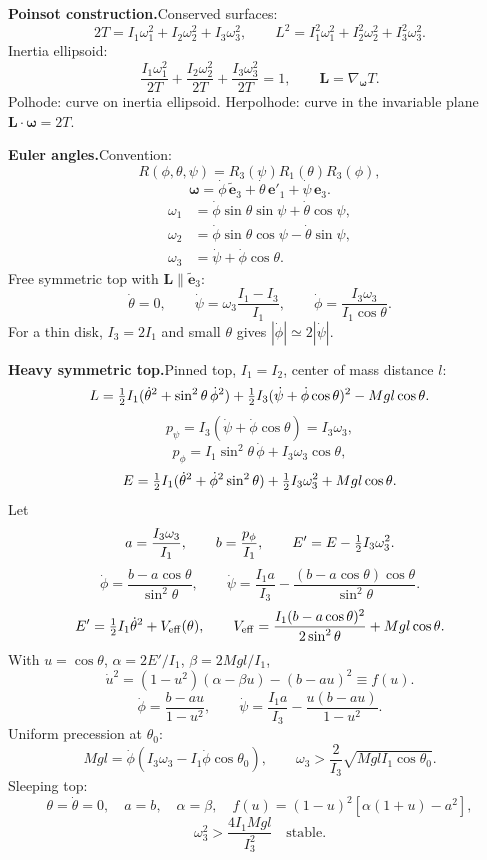 \noindent\textbf{Poinsot construction.}\quad Conserved surfaces:
\[
2T=I_1\omega_1^2+I_2\omega_2^2+I_3\omega_3^2,
\qquad
L^2=I_1^2\omega_1^2+I_2^2\omega_2^2+I_3^2\omega_3^2.
\]
Inertia ellipsoid:
\[
\frac{I_1\omega_1^2}{2T}
+\frac{I_2\omega_2^2}{2T}
+\frac{I_3\omega_3^2}{2T}=1,\qquad
\mathbf L=\nabla_{\bm\omega}T.
\]
Polhode: curve on inertia ellipsoid. Herpolhode: curve in the invariable plane
$\mathbf L\cdot\bm\omega=2T$.

\noindent\textbf{Euler angles.}\quad Convention:
\[
R(\phi,\theta,\psi)=R_3(\psi)R_1(\theta)R_3(\phi),
\]
\[
\bm\omega=\dot\phi\,\tilde{\mathbf e}_3+\dot\theta\,\mathbf e'_1+\dot\psi\,\mathbf e_3.
\]
\[
\boxed{
\begin{aligned}
\omega_1&=\dot\phi\sin\theta\sin\psi+\dot\theta\cos\psi,\\
\omega_2&=\dot\phi\sin\theta\cos\psi-\dot\theta\sin\psi,\\
\omega_3&=\dot\psi+\dot\phi\cos\theta.
\end{aligned}}
\]
Free symmetric top with $\mathbf L\parallel\tilde{\mathbf e}_3$:
\[
\dot\theta=0,\qquad
\dot\psi=\omega_3\frac{I_1-I_3}{I_1},\qquad
\dot\phi=\frac{I_3\omega_3}{I_1\cos\theta}.
\]
For a thin disk, $I_3=2I_1$ and small $\theta$ gives $|\dot\phi|\simeq2|\dot\psi|$.

\noindent\textbf{Heavy symmetric top.}\quad Pinned top, $I_1=I_2$, center of mass
distance $l$:
\[
L=\tfrac{1}{2} I_1(\dot\theta^2+\sin^2\theta\,\dot\phi^2)
+\tfrac{1}{2} I_3(\dot\psi+\dot\phi\cos\theta)^2-Mgl\cos\theta.
\]
\[
p_\psi=I_3(\dot\psi+\dot\phi\cos\theta)=I_3\omega_3,
\]
\[
p_\phi=I_1\sin^2\theta\,\dot\phi+I_3\omega_3\cos\theta,
\]
\[
E=\tfrac{1}{2} I_1(\dot\theta^2+\dot\phi^2\sin^2\theta)
+\tfrac{1}{2} I_3\omega_3^2+Mgl\cos\theta.
\]
Let
\[
a=\frac{I_3\omega_3}{I_1},\qquad b=\frac{p_\phi}{I_1},\qquad
E'=E-\tfrac{1}{2} I_3\omega_3^2.
\]
\[
\dot\phi=\frac{b-a\cos\theta}{\sin^2\theta},\qquad
\dot\psi=\frac{I_1a}{I_3}
-\frac{(b-a\cos\theta)\cos\theta}{\sin^2\theta}.
\]
\[
E'=\tfrac{1}{2} I_1\dot\theta^2+V_{\rm eff}(\theta),
\qquad
V_{\rm eff}=\frac{I_1(b-a\cos\theta)^2}{2\sin^2\theta}+Mgl\cos\theta.
\]
With $u=\cos\theta$, $\alpha=2E'/I_1$, $\beta=2Mgl/I_1$,
\[
\boxed{\dot u^2=(1-u^2)(\alpha-\beta u)-(b-au)^2\equiv f(u)}.
\]
\[
\dot\phi=\frac{b-au}{1-u^2},\qquad
\dot\psi=\frac{I_1a}{I_3}-\frac{u(b-au)}{1-u^2}.
\]
Uniform precession at $\theta_0$:
\[
Mgl=\dot\phi(I_3\omega_3-I_1\dot\phi\cos\theta_0),\qquad
\omega_3>\frac{2}{I_3}\sqrt{MglI_1\cos\theta_0}.
\]
Sleeping top:
\[
\theta=\dot\theta=0,\quad a=b,\quad \alpha=\beta,\quad
f(u)=(1-u)^2[\alpha(1+u)-a^2],
\]
\[
\boxed{\omega_3^2>\frac{4I_1Mgl}{I_3^2}\quad\text{stable}}.
\]

